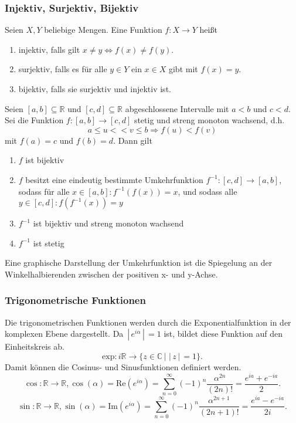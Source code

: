 \documentclass[a4paper,12pt]{article}
\begin{document}
\subsubsection{Injektiv, Surjektiv, Bijektiv}
Seien $X,Y$ beliebige Mengen. Eine Funktion $f:X\rightarrow Y$ heißt
\begin{enumerate}[label=(\alph*)]
        \item injektiv, falls gilt $x\neq y\Leftrightarrow f\left(x\right)\neq f\left(y\right)$. 
        \item surjektiv, falls es für alle $y \in Y$ ein $x \in X$ gibt mit $f\left(x\right)=y$.
        \item bijektiv, falls sie surjektiv und injektiv ist.
\end{enumerate}
Seien $[a,b]\subseteq \mathbb{R}$ und $[c,d]\subseteq \mathbb{R}$ abgeschlossene Intervalle mit $a<b$ und $c<d$. Sei die Funktion $f:[a,b]\rightarrow [c,d]$ stetig und streng monoton wachsend, d.h.
\[ 
        a\leq u<<v\leq b\Rightarrow f\left(u\right)<f\left(v\right)
\] 
mit $f\left(a\right)=c$ und $f\left(b\right)=d$. Dann gilt
\begin{enumerate}[label=(\alph*)]
        \item $f$ ist bijektiv
        \item $f$ besitzt eine eindeutig bestimmte Umkehrfunktion $f^{-1}:[c,d]\rightarrow [a,b]$, sodass für alle $x \in [a,b]:f^{-1}\left(f\left(x\right)\right)=x$, und sodass alle $y \in [c,d]:f\left(f^{-1}\left(x\right)\right)=y$
        \item $f^{-1}$ ist bijektiv und streng monoton wachsend
        \item $f^{-1}$ ist stetig
\end{enumerate}
Eine graphische Darstellung der Umkehrfunktion ist die Spiegelung an der Winkelhalbierenden zwischen der positiven x- und y-Achse.

\subsubsection{Trigonometrische Funktionen}
Die trigonometrischen Funktionen werden durch die Exponentialfunktion in der komplexen Ebene dargestellt. Da $\,|\, e^{i\alpha }\,|\, =1$ ist, bildet diese Funktion auf den Einheitskreis ab.
\[ 
        \text{exp}:i\mathbb{R}\rightarrow \{z \in \mathbb{C}\,|\, \,|\, z\,|\, =1\}
.\] 
Damit können die Cosinus- und Sinusfunktionen definiert werden.
\[ 
        \cos :\mathbb{R}\rightarrow \mathbb{R},\cos \left(\alpha \right)=\text{Re}\left(e^{i\alpha }\right)=\sum_{n=0}^{\infty}\left(-1\right)^{n}\dfrac{\alpha ^{2n}}{\left(2n\right)!}=\dfrac{e^{ia}+e^{-ia}}{2}
.\] 
\[ 
        \sin :\mathbb{R}\rightarrow \mathbb{R},\sin \left(\alpha \right)=\text{Im}\left(e^{i\alpha }\right)=\sum_{n=0}^{\infty}\left(-1\right)^{n}\dfrac{\alpha ^{2n+1}}{\left(2n+1\right)!}=\dfrac{e^{ia}-e^{-ia}}{2i}
.\] 
\end{document}
